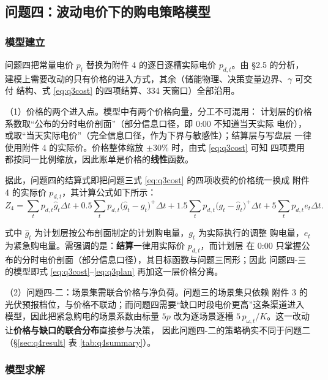 \documentclass[withoutpreface]{cumcmthesis}
\renewcommand{\emph}[1]{\textbf{#1}}
\begin{document}
\subsection{问题四：波动电价下的购电策略模型}
\label{sec:q4model}

\subsubsection{模型建立}

问题四把常量电价 $p_t$ 替换为附件 4 的逐日逐槽实际电价 $p_{d,t}$。由 \S2.5 的分析，
建模上需要改动的只有价格的进入方式，其余（储能物理、决策变量边界、$\gamma$ 可交付
结构、式 \eqref{eq:q3cost} 的四项结算、334 天窗口）全部沿用。

\noindent（1）价格的两个进入点。模型中有两个价格向量，分工不可混用：
计划层的价格系数取“公布的分时电价剖面”（部分信息口径，即 0:00 不知道当天实际
电价），或取“当天实际电价”（完全信息口径，作为下界与敏感性）；结算层与写盘层
一律使用附件 4 的实际价。价格整体缩放 $\pm30\%$ 时，由式 \eqref{eq:q3cost} 可知
四项费用都按同一比例缩放，因此账单是价格的\emph{线性}函数。

据此，问题四的结算式即把问题三式 \eqref{eq:q3cost} 的四项收费的价格统一换成
附件 4 的实际价 $p_{d,t}$，其计算公式如下所示：
\begin{equation}
Z_4=\sum_t p_{d,t}\hat g_t\Delta t
  +0.5\sum_t p_{d,t}\bigl(\hat g_t-g_t\bigr)^{+}\Delta t
  +1.5\sum_t p_{d,t}\bigl(g_t-\hat g_t\bigr)^{+}\Delta t
  +5\sum_t p_{d,t}e_t\Delta t .
\label{eq:q4cost}
\end{equation}

\noindent 式中 $\hat g_t$ 为计划层按公布剖面制定的计划购电量，$g_t$ 为实际执行的调整
购电量，$e_t$ 为紧急购电量。需强调的是：\emph{结算}一律用实际价 $p_{d,t}$，而计划层
在 0:00 只掌握公布的分时电价剖面（部分信息口径），其目标函数与问题三同形；因此
问题四-三的模型即式 \eqref{eq:q3cost}--\eqref{eq:q3plan} 再加这一层价格分离。

\noindent（2）问题四-二：场景集需联合价格与净负荷。问题三的场景集只依赖
附件 3 的光伏预报档位，与价格不联动；而问题四需要“缺口时段电价更高”这条渠道进入
模型，因此把紧急购电的场景系数由标量 $5p$ 改为逐场景逐槽
$5\,p_{\omega,t}/K$。这一改动让\emph{价格与缺口的联合分布}直接参与决策，
因此问题四-二的策略确实不同于问题二（\S\ref{sec:q4result} 表
\ref{tab:q4summary}）。

\subsubsection{模型求解}
\end{document}
